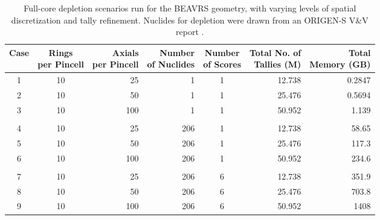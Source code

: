 \documentclass[12pt,twoside]{mitthesis-exec}
\begin{document}
\begin{table}
  \begin{center}
    \caption[Full-core depletion test scenarios]{Full-core depletion scenarios
    run for the BEAVRS geometry, with varying levels of spatial discretization
    and tally refinement. Nuclides for depletion were drawn from an ORIGEN-S
    V\&V report \cite{nuclides206}. \label{tbl:depletion_meshes}}
    \begin{tabular}{ccrrcrr}
    \toprule
    Case & 
    \pbox{20cm}{Rings \\ per Pincell} & 
    \pbox{20cm}{Axials \\ per Pincell} & 
    \pbox{20cm}{Number \\ of Nuclides} & 
    \pbox{20cm}{Number \\ of Scores} & 
    \pbox{20cm}{Total No. of \\ Tallies (M)} & 
    \pbox{20cm}{Total \\ Memory (GB)} \\
    \midrule
1 & 10 & 25 & 1 & 1 & 12.738 & 0.2847 \\
2 & 10 & 50 & 1 & 1 & 25.476 & 0.5694 \\
3 & 10 & 100 & 1 & 1 & 50.952 & 1.139 \\
 & & & & & & \\
4 & 10 & 25 & 206 & 1 & 12.738 & 58.65 \\
5 & 10 & 50 & 206 & 1 & 25.476 & 117.3 \\
6 & 10 & 100 & 206 & 1 & 50.952 & 234.6 \\
 & & & & & & \\
7 & 10 & 25 & 206 & 6 & 12.738 & 351.9 \\
8 & 10 & 50 & 206 & 6 & 25.476 & 703.8 \\
9 & 10 & 100 & 206 & 6 & 50.952 & 1408 \\
    \bottomrule
    \end{tabular}
  \end{center}
\end{table}
\end{document}
